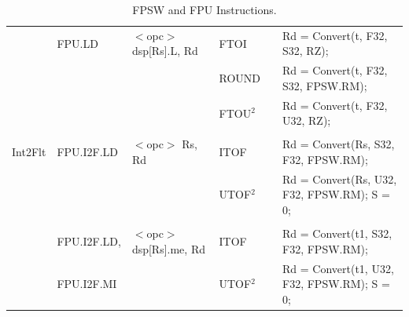 \begin{table}
\begin{subtable}{\linewidth}
\begin{center}
\begin{tabular}{llllll}
                   & FPU.LD            & $<$opc$>$ dsp[Rs].L, Rd               & FTOI              & \flags{-**-}      & Rd = Convert(t, F32, S32, RZ);                                                \\
                   &                   &                                       & ROUND             & \flags{-**-}      & Rd = Convert(t, F32, S32, FPSW.RM);                                           \\
                   &                   &                                       & FTOU$^2$          & \flags{-**-}      & Rd = Convert(t, F32, U32, RZ);                                                \\
                   &                   &                                       &                   &                   &                                                                               \\
Int2Flt            & FPU.I2F.LD        & $<$opc$>$ Rs, Rd                      & ITOF              & \flags{-**-}      & Rd = Convert(Rs, S32, F32, FPSW.RM);                                          \\
                   &                   &                                       & UTOF$^2$          & \flags{-!*-}      & Rd = Convert(Rs, U32, F32, FPSW.RM); S = 0;                                   \\
                   &                   &                                       &                   &                   &                                                                               \\
                   & FPU.I2F.LD,       & $<$opc$>$ dsp[Rs].me, Rd              & ITOF              & \flags{-**-}      & Rd = Convert(t1, S32, F32, FPSW.RM);                                          \\
                   & FPU.I2F.MI        &                                       & UTOF$^2$          & \flags{-!*-}      & Rd = Convert(t1, U32, F32, FPSW.RM); S = 0;                                   \\ \hline
\end{tabular}
\end{center}
\captionsetup{font=scriptsize, labelfont=scriptsize}
\caption{Floating Point Unit (FPU) Instructions. t = Mem(Rs + dsp, L) and t1 = Mem(Rs + dsp, me). 
Flags are not updated when floating point exception is generated. SetFlags(op1, op2) corresponds 
to Z = (op1 == op2); S = (op1 $<$ op2); O = IsNaN(op1) $\mid\mid$ IsNaN(op2);}
\end{subtable}

\captionsetup{font=scriptsize, labelfont=scriptsize}
\caption{FPSW and FPU Instructions.}
\end{table}



